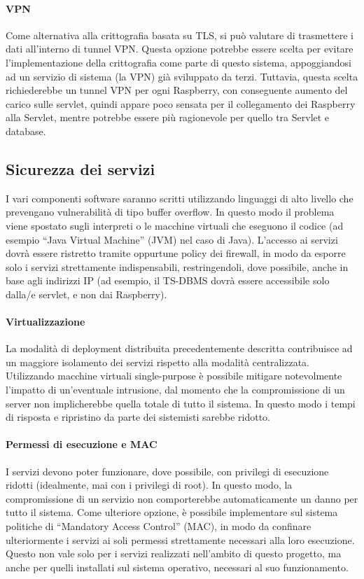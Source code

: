 \paragraph{VPN}
Come alternativa alla crittografia basata su TLS, si può valutare di trasmettere i dati all'interno di tunnel VPN.
Questa opzione potrebbe essere scelta per evitare l'implementazione della crittografia come parte di questo sistema, appoggiandosi ad un servizio di sistema (la VPN) già sviluppato da terzi.
Tuttavia, questa scelta richiederebbe un tunnel VPN per ogni Raspberry, con conseguente aumento del carico sulle servlet, quindi appare poco sensata per il collegamento dei Raspberry alla Servlet, mentre potrebbe essere più ragionevole per quello tra Servlet e database.

\subsection{Sicurezza dei servizi}
I vari componenti software saranno scritti utilizzando linguaggi di alto livello che prevengano vulnerabilità di tipo buffer overflow.
In questo modo il problema viene spostato sugli interpreti o le macchine virtuali che eseguono il codice (ad esempio ``Java Virtual Machine'' (JVM) nel caso di Java).
L'accesso ai servizi dovrà essere ristretto tramite oppurtune policy dei firewall, in modo da esporre solo i servizi strettamente indispensabili, restringendoli, dove possibile, anche in base agli indirizzi IP (ad esempio, il TS-DBMS dovrà essere accessibile solo dalla/e servlet, e non dai Raspberry).
\paragraph{Virtualizzazione}
La modalità di deployment distribuita precedentemente descritta contribuisce ad un maggiore isolamento dei servizi rispetto alla modalità centralizzata.
Utilizzando macchine virtuali single-purpose è possibile mitigare notevolmente l'impatto di un'eventuale intrusione, dal momento che la compromissione di un server non implicherebbe quella totale di tutto il sistema.
In questo modo i tempi di risposta e ripristino da parte dei sistemisti sarebbe ridotto.
\paragraph{Permessi di esecuzione e MAC}
I servizi devono poter funzionare, dove possibile, con privilegi di esecuzione ridotti (idealmente, mai con i privilegi di root).
In questo modo, la compromissione di un servizio non comporterebbe automaticamente un danno per tutto il sistema.
Come ulteriore opzione, è possibile implementare sul sistema politiche di ``Mandatory Access Control'' (MAC), in modo da confinare ulteriormente i servizi ai soli permessi strettamente necessari alla loro esecuzione.
Questo non vale solo per i servizi realizzati nell'ambito di questo progetto, ma anche per quelli installati sul sistema operativo, necessari al suo funzionamento.
